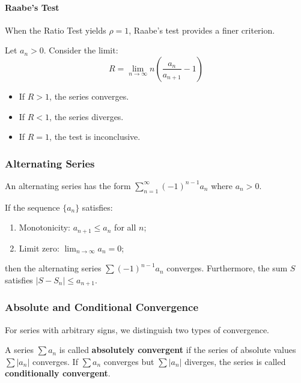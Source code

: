 \paragraph{Raabe's Test}
When the Ratio Test yields $\rho = 1$, Raabe's test provides a finer criterion.

\begin{theorem}
Let $a_n > 0$. Consider the limit:
\[ R = \lim_{n \to \infty} n \left( \frac{a_n}{a_{n+1}} - 1 \right) \]
\begin{itemize}
    \item If $R > 1$, the series converges.
    \item If $R < 1$, the series diverges.
    \item If $R = 1$, the test is inconclusive.
\end{itemize}
\end{theorem}

\subsubsection{Alternating Series}
An alternating series has the form $\sum_{n=1}^{\infty} (-1)^{n-1} a_n$ where $a_n > 0$.

\begin{theorem}
If the sequence $\{a_n\}$ satisfies:
\begin{enumerate}
    \item Monotonicity: $a_{n+1} \le a_n$ for all $n$;
    \item Limit zero: $\lim_{n \to \infty} a_n = 0$;
\end{enumerate}
then the alternating series $\sum (-1)^{n-1} a_n$ converges.
Furthermore, the sum $S$ satisfies $|S - S_n| \le a_{n+1}$.
\end{theorem}

\subsubsection{Absolute and Conditional Convergence}
For series with arbitrary signs, we distinguish two types of convergence.

\begin{definition}
A series $\sum a_n$ is called \textbf{absolutely convergent} if the series of absolute values $\sum |a_n|$ converges.
If $\sum a_n$ converges but $\sum |a_n|$ diverges, the series is called \textbf{conditionally convergent}.
\end{definition}

